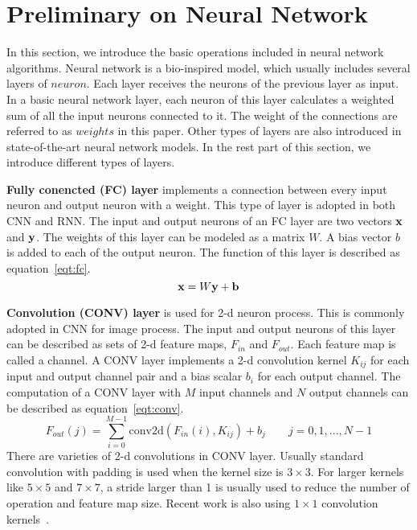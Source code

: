 \section{Preliminary on Neural Network}\label{sec:preliminary}

In this section, we introduce the basic operations included in neural network algorithms. Neural network is a bio-inspired model, which usually includes several layers of $neuron$. Each layer receives the neurons of the previous layer as input. In a basic neural network layer, each neuron of this layer calculates a weighted sum of all the input neurons connected to it. The weight of the connections are referred to as $weights$ in this paper. Other types of layers are also introduced in state-of-the-art neural network models. In the rest part of this section, we introduce different types of layers.

{\bf{Fully conencted (FC) layer}} implements a connection between every input neuron and output neuron with a weight. This type of layer is adopted in both CNN and RNN. The input and output neurons of an FC layer are two vectors $\bf{x}$ and $\bf{y}$. The weights of this layer can be modeled as a matrix $W$. A bias vector $b$ is added to each of the output neuron. The function of this layer is described as equation~\ref{eqt:fc}.
\begin{equation}\label{eqt:fc}
    {\bf{x}} = W{\bf{y}} + {\bf{b}}
\end{equation}

{\bf{Convolution (CONV) layer}} is used for 2-d neuron process. This is commonly adopted in CNN for image process. The input and output neurons of this layer can be described as sets of 2-d feature maps, $F_{in}$ and $F_{out}$. Each feature map is called a channel. A CONV layer implements a 2-d convolution kernel $K_{ij}$ for each input and output channel pair and a bias scalar $b_i$ for each output channel. The computation of a CONV layer with $M$ input channels and $N$ output channels can be described as equation~\ref{eqt:conv}.
\begin{equation}\label{eqt:conv}
    F_{out}(j) = \sum_{i=0}^{M-1} \text{conv2d}(F_{in}(i), K_{ij}) + b_j \qquad j=0,1,...,N-1
\end{equation}
There are varieties of 2-d convolutions in CONV layer. Usually standard convolution with padding is used when the kernel size is $3\times 3$. For larger kernels like $5\times 5$ and $7\times 7$, a stride larger than 1 is usually used to reduce the number of operation and feature map size. Recent work is also using $1\times 1$ convolution kernels~\cite{he2016deep, iandola2016squeezenet}.

